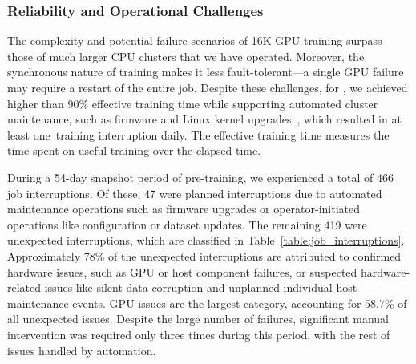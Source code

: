 \subsubsection{Reliability and Operational Challenges}

The complexity and potential failure scenarios of 16K GPU training surpass those of much larger CPU clusters that we have operated. Moreover, the synchronous nature of training makes it less fault-tolerant---a single GPU failure may require a restart of the entire job. Despite these challenges, for \llamathree, we achieved higher than 90\% effective training time while supporting automated cluster maintenance, such as firmware and Linux kernel upgrades~\citep{leonhardi2024maintenance}, which resulted in at least one~training interruption daily. The effective training time measures the time spent on useful training over the elapsed time.

During a 54-day snapshot period of pre-training, we experienced a total of 466 job interruptions. Of these, 47 were planned interruptions due to automated maintenance operations such as firmware upgrades or operator-initiated operations like configuration or dataset updates. The remaining 419 were unexpected interruptions, which are classified in Table~\ref{table:job_interruptions}.
Approximately 78\% of the unexpected interruptions are attributed to confirmed hardware issues, such as GPU or host component failures, or suspected hardware-related issues like silent data corruption and unplanned individual host maintenance events. GPU issues are the largest category, accounting for 58.7\% of all unexpected issues.  Despite the large number of failures, significant manual intervention was required only three times during this period, with the rest of issues handled by automation. 

